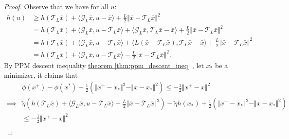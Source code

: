 \documentclass[12pt]{article}
\begin{document}
    \begin{proof}
        Observe that we have for all $u$: 
        \begin{align*}
            h(u) &\ge 
            h(\mathcal T_L\bar x) + 
            \langle \mathcal G_L \bar x, u - \bar x\rangle + 
            \frac{L}{2}\Vert \bar x - \mathcal T_L \bar x\Vert^2
            \\
            &= 
            h(\mathcal T_L \bar x) + 
            \langle \mathcal G_L \bar x, u - \mathcal T_L \bar x\rangle
            + 
            \langle \mathcal G_L \bar x, \mathcal T_L \bar x - \bar x\rangle
            + 
            \frac{L}{2}\Vert \bar x - \mathcal T_L \bar x \Vert^2
            \\
            &= 
            h(\mathcal T_L \bar x) + 
            \langle \mathcal G_L \bar x, u - \mathcal T_L \bar x\rangle
            + 
            \langle 
                L (\bar x - \mathcal T_L \bar x)
                , 
                \mathcal T_L \bar x - \bar x
            \rangle
            + 
            \frac{L}{2}\Vert \bar x - \mathcal T_L \bar x\Vert^2
            \\
            &= 
            h(\mathcal T_L \bar x) + 
            \langle \mathcal G_L \bar x, u - \mathcal T_L \bar x\rangle 
            - \frac{L}{2} \Vert \bar x - \mathcal T_L \bar x\Vert^2. 
        \end{align*}
        By PPM descent inequality
        \hyperref[thm:ppm_descent_ineq]{theorem \ref*{thm:ppm_descent_ineq}}
        , let $x_*$ be a minimizer, it claims that 
        {\small
        \begin{align*}
            & 
            \phi(x^+) - \phi (x^*) + 
            \frac{1}{2}\left(
                \Vert x^+ - x_*\Vert^2 - 
                \Vert x - x_*\Vert^2
            \right)
            \le 
            - \frac{1}{2}\Vert x^+ - x\Vert^2
            \\
            \implies &
            \tilde 
            \eta 
            \left(   
                h(\mathcal T_L \bar x) + 
                \langle \mathcal G_L \bar x, u - \mathcal T_L \bar x\rangle 
                - \frac{L}{2} \Vert \bar x - \mathcal T_L \bar x\Vert^2
            \right)
            - \tilde \eta h (x_*)
            +
            \frac{1}{2}\left(
                \Vert x^+ - x_*\Vert^2 - 
                \Vert x - x_*\Vert^2
            \right)
            \\
            &\le 
            - \frac{1}{2}\Vert x^+ - x\Vert^2
            \\

\end{align*}}
\end{proof}
\end{document}
